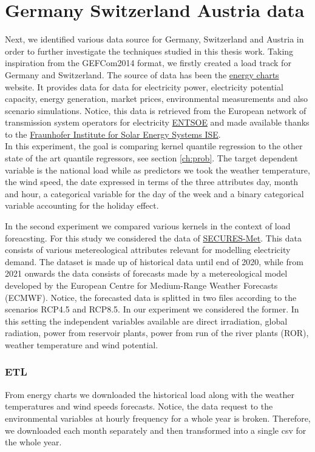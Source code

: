 \section{Germany Switzerland Austria data}
Next, we identified various data source for Germany, Switzerland and Austria in order to further
investigate the techniques studied in this thesis work.
Taking inspiration from the GEFCom2014 format, we firstly created a load track for Germany and Switzerland. 
The source of data has been the \href{https://www.energy-charts.info/index.html?l=en&c=DE}{energy charts} website. It provides data for data for electricity power, electricity potential capacity, energy generation, market prices, environmental measurements and also scenario simulations. Notice, this data is retrieved from the European network of transmission system operators for electricity \href{https://www.entsoe.eu/}{ENTSOE} and made available thanks to the \href{https://ise.fraunhofer.de/en.html}{Fraunhofer Institute for Solar Energy Systems ISE}.
\\
In this experiment, the goal is comparing kernel quantile regression to the other state of the art quantile regressors, see section \ref{ch:prob}.
The target dependent variable is the national load while as predictors we took
the weather temperature, the wind speed, the date expressed in terms of the three attributes day, month and hour, a categorical variable for the day of the week and a binary categorical variable accounting for the holiday effect.


In the second experiment we compared various kernels in the context of load foreacsting.
For this study we considered the data of \href{https://zenodo.org/records/7907883}{SECURES-Met}. This data consists of various metereological attributes relevant for modelling electricity demand. The dataset is made up of historical data until end of 2020, while from 2021 onwards the data consists of forecasts made by a metereological model developed by the European Centre for Medium-Range Weather Forecasts (ECMWF). Notice, the forecasted data is splitted in two files according to the scenarios RCP4.5 and RCP8.5. In our experiment we considered the former. 
In this setting the independent variables available are 
direct irradiation, global radiation, power from reservoir plants, power from run of the river plants (ROR), weather temperature and wind potential.

\subsubsection{ETL}
From energy charts we downloaded the historical load along with the weather temperatures and wind speeds forecasts. Notice, the data request to the environmental variables at hourly frequency for a whole year is broken. Therefore, we downloaded each month separately and then transformed into a single csv for the whole year.

